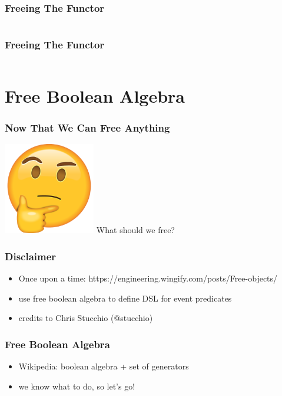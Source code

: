 \documentclass{beamer}
\begin{document}
\begin{frame}[fragile]
  \frametitle{Freeing The Functor}
  \inputminted{scala}{snippets/free-functor3.scala}
\end{frame}

\begin{frame}[fragile]
  \frametitle{Freeing The Functor}
  \inputminted{scala}{snippets/free-functor4.scala}
\end{frame}

\section{Free Boolean Algebra}\label{sec:free-boolean-algebra}

\begin{frame}
  \frametitle{Now That We Can Free Anything}
  \begin{center}
    \includegraphics[width=0.3\textwidth]{static-images/thinking.png}
    \vfill
    \Huge What should we free?
  \end{center}
\end{frame}

\begin{frame}
  \frametitle{Disclaimer}
  \begin{itemize}
  \item Once upon a time: https://engineering.wingify.com/posts/Free-objects/
  \item use free boolean algebra to define DSL for event predicates
  \item credits to Chris Stucchio (@stucchio)
  \end{itemize}
\end{frame}

\begin{frame}
  \frametitle{Free Boolean Algebra}
  \begin{itemize}
  \item Wikipedia: boolean algebra + set of generators
  \item we know what to do, so let's go!
  \end{itemize}
\end{frame}
\end{document}
